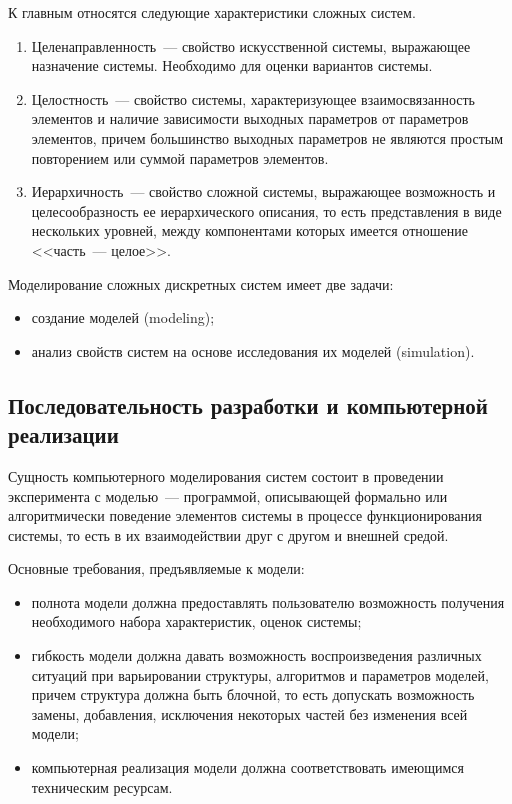 К главным относятся следующие характеристики сложных систем.

\begin{enumerate}
    \item Целенаправленность~--- свойство искусственной системы, выражающее назначение системы. Необходимо для оценки вариантов системы.
    \item Целостность~--- свойство системы, характеризующее взаимосвязанность элементов и наличие зависимости выходных параметров от параметров элементов, причем большинство выходных параметров не являются простым повторением или суммой параметров элементов.
    \item Иерархичность~--- свойство сложной системы, выражающее возможность и целесообразность ее иерархического описания, то есть представления в виде нескольких уровней, между компонентами которых имеется отношение <<часть~--- целое>>.
\end{enumerate}

Моделирование сложных дискретных систем имеет две задачи:

\begin{itemize}
    \item создание моделей (modeling);
    \item анализ свойств систем на основе исследования их моделей (simulation).
\end{itemize}

\subsection{Последовательность разработки и компьютерной реализации}

Сущность компьютерного моделирования систем состоит в проведении эксперимента с моделью~--- программой, описывающей формально или алгоритмически поведение элементов системы в процессе функционирования системы, то есть в их взаимодействии друг с другом и внешней средой.

Основные требования, предъявляемые к модели:

\begin{itemize}
    \item полнота модели должна предоставлять пользователю возможность получения необходимого набора характеристик, оценок системы;
    \item гибкость модели должна давать возможность воспроизведения различных ситуаций при варьировании структуры, алгоритмов и параметров моделей, причем структура должна быть блочной, то есть допускать возможность замены, добавления, исключения некоторых частей без изменения всей модели;
    \item компьютерная реализация модели должна соответствовать имеющимся техническим ресурсам.
\end{itemize}

